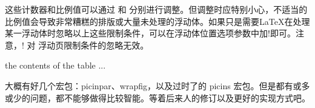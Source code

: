 这些计数器和比例值可以通过  和
分别进行调整。但调整时应特别小心，不适当的比例值会导致非常糟糕的排版或大量未处理的浮动体。如果只是需要LaTeX在处理某一浮动体时忽略以上这些限制条件，可以在浮动体位置选项参数中加!即可。注意，!
对 浮动页限制条件的忽略无效。

\begin{texinlist}
\begin{table}[!hbt]
  the contents of the table ...
\end{table}
\end{texinlist}



大概有好几个宏包：picinpar、wrapfig，以及过时了的 picins
宏包。但是都有或多或少的问题，都不能够做得比较智能。等着后来人的修订以及更好的实现方式吧。

